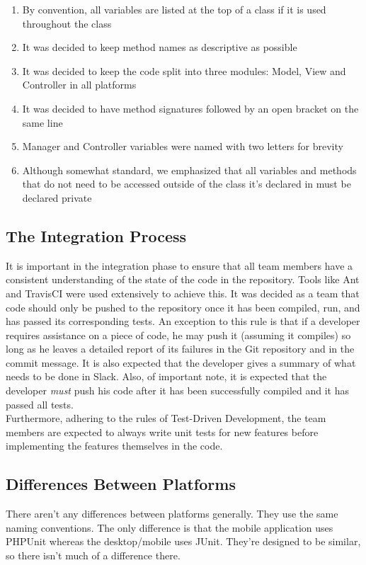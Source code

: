 \documentclass[12pt]{report}
\begin{document}
\begin{enumerate}
    \item By convention, all variables are listed at the top of a class if it is used throughout the class
    \item It was decided to keep method names as descriptive as possible
	\item It was decided to keep the code split into three modules: Model, View and
		Controller in all platforms
    \item It was decided to have method signatures followed by an open bracket on the same line
    \item Manager and Controller variables were named with two letters for brevity
	\item Although somewhat standard, we emphasized that all variables and methods that do not need
		to be accessed outside of the class it's declared in must be declared private
\end{enumerate}

\subsection{The Integration Process}
It is important in the integration phase to ensure that all team members have a consistent
understanding of the state of the code in the repository. Tools like Ant and TravisCI were used
extensively to achieve this. It was decided as a team that code should only be pushed to the
repository once it has been compiled, run, and has passed its corresponding tests. An exception to
this rule is that if a developer requires assistance on a piece of code, he may push it (assuming it
compiles) so long as he leaves a detailed report of its failures in the Git repository and in the
commit message. It is also expected that the developer gives a summary of what needs to be done in
Slack. Also, of important note, it is expected that the developer \textit{must} push his code after
it has been successfully compiled and it has passed all tests.\\
Furthermore, adhering to the rules of Test-Driven Development, the team members are expected to
always write unit tests for new features before implementing the features themselves in the code.

\subsection{Differences Between Platforms}
There aren't any differences between platforms generally. They use the same naming conventions. The only difference is that the mobile application uses PHPUnit whereas the desktop/mobile uses JUnit. They're designed to be similar, so there isn't much of a difference there. 
\end{document}
